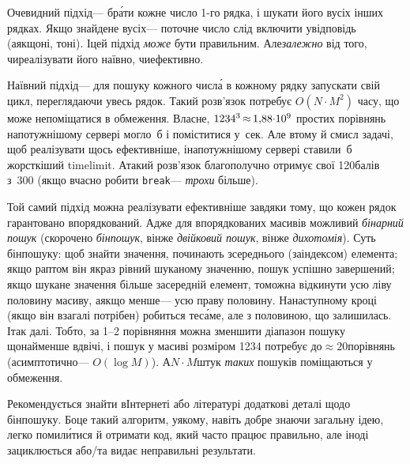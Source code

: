 \Tutorial	
Очевидний підхід\nolinebreak[3] --- бр\'{а}ти кожне число \mbox{1-го} рядка, і шукати його в\nolinebreak[3] усіх інших рядках. Якщо знайдене в\nolinebreak[3] усіх\nolinebreak[3] --- поточне число слід включити у\nolinebreak[3] відповідь (а\nolinebreak[3] якщо\nolinebreak[2] ні, то\nolinebreak[3] ні).
І\nolinebreak[3] цей підхід \emph{може} бути правильним. Але\nolinebreak[2] \emph{залежно} від того, чи\nolinebreak[3] реалізувати його наївно, чи\nolinebreak[3] ефективно. 

Наївний підхід\nolinebreak[3] --- для пошуку кожного числ\'{а} в кожному рядку запускати свій цикл, переглядаючи увесь рядок. Такий розв'язок потребує $O(N{\cdot}M^2)$ часу, що може не\nolinebreak[3] поміщатися в обмеження. Власне, $1234^3\dib{{\approx}}{1{,}88{\cdot}10^9}$ простих порівнянь на\nolinebreak[2] потужнішому сервері могло~б і поміститися у~сек. Але в\nolinebreak[3] тому й смисл задачі, щоб реалізувати щось ефективніше, і\nolinebreak[3] на\nolinebreak[3] потужнішому сервері ставили~б жорсткіший time\nolinebreak[2] limit. А\nolinebreak[3] такий розв'язок благополучно отримує свої 120\nolinebreak[3] балів з~300 (якщо вчасно робити \texttt{break}\nolinebreak[3] --- \emph{трохи} більше).

Той самий підхід можна реалізувати ефективніше завдяки тому, що кожен рядок гарантовано впорядкований. Адже для впорядкованих масивів можливий \emph{бінарний пошук} (скорочено \emph{бін\-пошук}, він\nolinebreak[3] же \emph{двійковий пошук}, він\nolinebreak[3] же \emph{дихотомія}). Суть бінпошуку: щоб знайти значення, починають з\nolinebreak[3] середнього (за\nolinebreak[3] індексом) елемента; якщо раптом він якраз рівний шуканому значенню, пошук успішно завершений; якщо шукане значення більше за\nolinebreak[3] середній елемент, то\nolinebreak[3] можна відкинути усю ліву половину масиву, а\nolinebreak[3] якщо менше\nolinebreak[3] --- усю праву половину. На\nolinebreak[3] наступному кроці (якщо він взагалі потрібен) робиться те\nolinebreak[3] с\'{а}ме, але з половиною, що залишилась. І\nolinebreak[3] так далі. Тобто, за 1--2 порівняння можна зменшити діапазон пошуку щонайменше вдвічі, і пошук у масиві розміром 1234 потребує до\nolinebreak[2] ${\approx}20$\nolinebreak[3] порівнянь (асимптотично\nolinebreak[3] --- $O(\log{}M)$). А\nolinebreak[3] $N{\cdot}M$\nolinebreak[2] штук \emph{таких} пошуків поміщаються у обмеження. 

Рекомендується знайти в\nolinebreak[3] Інтернеті або літературі додаткові деталі щодо бін\-пошуку. Бо\nolinebreak[3] це такий алгоритм, у\nolinebreak[3] якому, навіть добре знаючи загальну ідею, легко помил\'{и}тися й отримати код, який часто працює правильно, але іноді зациклюється або/та видає неправильні результати. 

